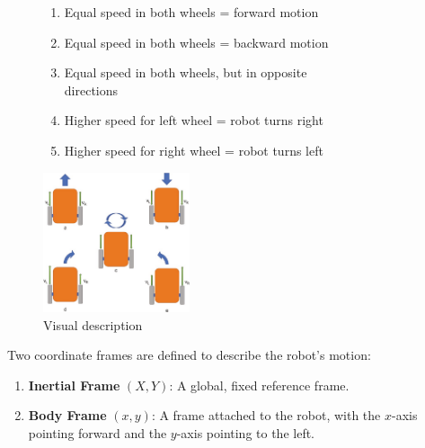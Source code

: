 \begin{figure}[H]
    \begin{minipage}{0.55\textwidth}
        \begin{enumerate}[label=\alph*)]
            \item Equal speed in both wheels = forward motion
            \item Equal speed in both wheels = backward motion
            \item Equal speed in both wheels, but in opposite\\ directions
            \item Higher speed for left wheel = robot turns right
            \item Higher speed for right wheel = robot turns left
        \end{enumerate}
    \end{minipage}
    \hfill
    \begin{minipage}{0.45\textwidth}
        \centering
        \includegraphics[width=1.7in]{pics/kine.png}
        \caption[Motion description of a two-wheel differential drive chassis]{Visual description~\cite{subramanian2023autonomous}}
        \label{kine1}
    \end{minipage}
\end{figure}

\vspace{-1em}

\noindent Two coordinate frames are defined to describe the robot's motion:

\vspace{-0.8em}

\begin{enumerate} 
    \setlength\itemsep{-0.5em}
    \item \textbf{Inertial Frame} $(X, Y)$: A global, fixed reference frame. 
    \item \textbf{Body Frame} $(x, y)$: A frame attached to the robot, with the $x$-axis pointing forward and the $y$-axis pointing to the left. 
\end{enumerate}


